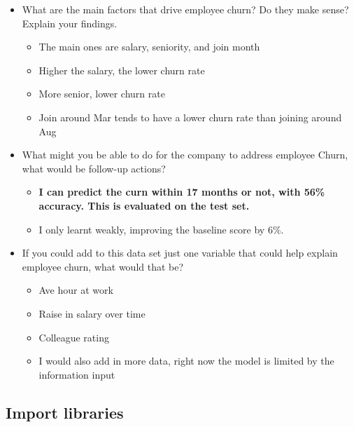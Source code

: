 \documentclass[11pt]{article}
\providecommand{\tightlist}{%
      \setlength{\itemsep}{0pt}\setlength{\parskip}{0pt}}
\begin{document}
\begin{itemize}
\tightlist
\item
  What are the main factors that drive employee churn? Do they make
  sense? Explain your findings.

  \begin{itemize}
  \tightlist
  \item
    The main ones are salary, seniority, and join month
  \item
    Higher the salary, the lower churn rate
  \item
    More senior, lower churn rate
  \item
    Join around Mar tends to have a lower churn rate than joining around
    Aug
  \end{itemize}
\item
  What might you be able to do for the company to address employee
  Churn, what would be follow-up actions?

  \begin{itemize}
  \tightlist
  \item
    \textbf{I can predict the curn within 17 months or not, with 56\%
    accuracy. This is evaluated on the test set.}
  \item
    I only learnt weakly, improving the baseline score by 6\%.
  \end{itemize}
\item
  If you could add to this data set just one variable that could help
  explain employee churn, what would that be?

  \begin{itemize}
  \tightlist
  \item
    Ave hour at work
  \item
    Raise in salary over time
  \item
    Colleague rating
  \item
    I would also add in more data, right now the model is limited by the
    information input
  \end{itemize}
\end{itemize}

    \hypertarget{import-libraries}{%
\subsection{Import libraries}\label{import-libraries}}
\end{document}
